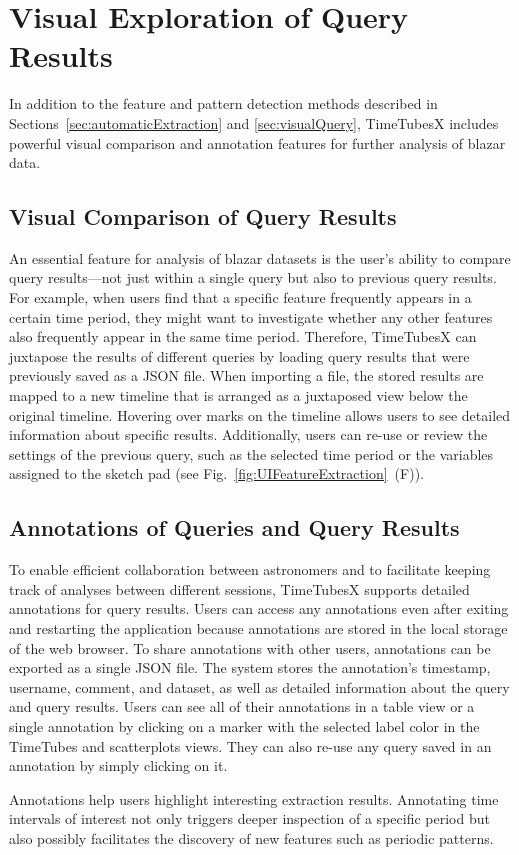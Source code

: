 \section{Visual Exploration of Query Results}\label{sec:otherFunctions}
In addition to the feature and pattern detection methods described in Sections~\ref{sec:automaticExtraction} and \ref{sec:visualQuery}, TimeTubesX includes powerful visual comparison and annotation features for further analysis of blazar data.

\subsection{Visual Comparison of Query Results}
An essential feature for analysis of blazar datasets is the user's ability to compare query results---not just within a single query but also to previous query results. 
For example, when users find that a specific feature frequently appears in a certain time period,
they might want to investigate whether any other features also frequently appear in the same time period.
Therefore, TimeTubesX can juxtapose the results of different queries
by loading query results that were previously saved as a JSON file.
When importing a file, the stored results are mapped to a new timeline that is arranged as a juxtaposed view below the original timeline.
Hovering over marks on the timeline allows users to see detailed information about specific results.
Additionally, users can re-use or review the settings of the previous query, such as the selected time period or the variables assigned to the sketch pad (see Fig.~\ref{fig:UIFeatureExtraction}~(F)).

\subsection{Annotations of Queries and Query Results}
To enable efficient collaboration between astronomers and to facilitate keeping track of analyses between different sessions, TimeTubesX supports detailed annotations for query results.
Users can access any annotations even after exiting and restarting the application because annotations are stored in the local storage of the web browser. 
To share annotations with other users, annotations can be exported as a single JSON file. 
The system stores the annotation's timestamp, username, comment, and dataset, as well as detailed information about the query and query results.
Users can see all of their annotations in a table view or a single annotation by clicking on a marker with the selected label color in the TimeTubes and scatterplots views.
They can also re-use any query saved in an annotation by simply clicking on it. 

Annotations help users highlight interesting extraction results.
Annotating time intervals of interest not only triggers deeper inspection of a specific period 
but also possibly facilitates the discovery of new features such as periodic patterns.